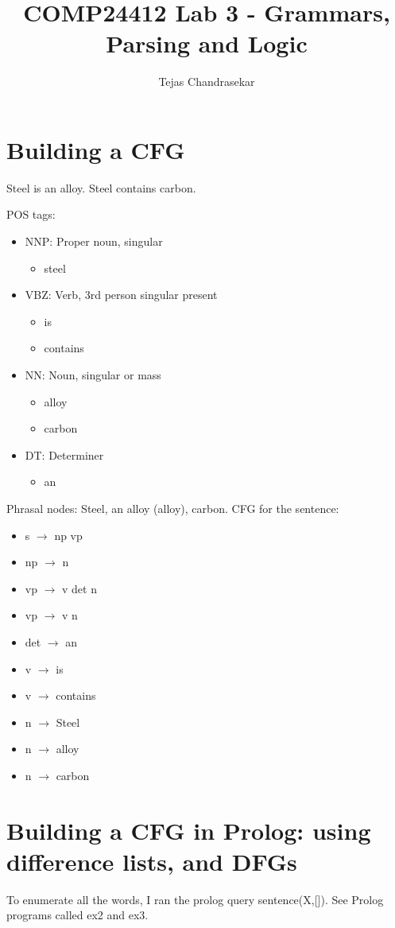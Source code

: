 \documentclass[12pt]{report}
\title{COMP24412 Lab 3 - Grammars, Parsing and Logic}
\author{Tejas Chandrasekar}
\begin{document}
\maketitle
\newpage

\section{Building a CFG}
Steel is an alloy. Steel contains carbon.\par
\noindent POS tags:
\begin{itemize}
  \item NNP: Proper noun, singular
  \begin{itemize}
    \item steel
  \end{itemize}
  \item VBZ: Verb, 3rd person singular present
  \begin{itemize}
    \item is
    \item contains
  \end{itemize}
  \item NN: Noun, singular or mass
  \begin{itemize}
    \item alloy
    \item carbon
  \end{itemize}
  \item DT: Determiner
  \begin{itemize}
    \item an
  \end{itemize}
\end{itemize}
Phrasal nodes: Steel, an alloy (alloy), carbon.
CFG for the sentence:
\begin{itemize}
  \item s $\rightarrow$ np vp
  \item np $\rightarrow$ n
  \item vp $\rightarrow$ v det n
  \item vp $\rightarrow$ v n
  \item det $\rightarrow$ an
  \item v $\rightarrow$ is
  \item v $\rightarrow$ contains
  \item n $\rightarrow$ Steel
  \item n $\rightarrow$ alloy
  \item n $\rightarrow$ carbon
\end{itemize}

\section{Building a CFG in Prolog: using difference lists, and DFGs}
To enumerate all the words, I ran the prolog query sentence(X,[]).
See Prolog programs called ex2 and ex3.
\end{document}
